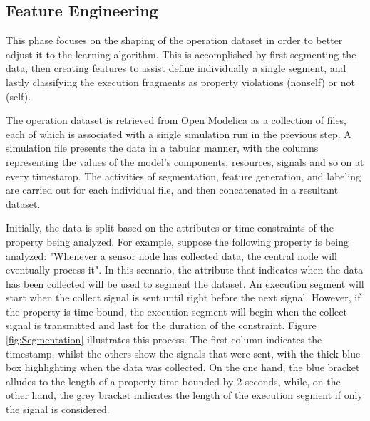 

\subsection{Feature Engineering}

This phase focuses on the shaping of the operation dataset in order to better adjust it to the learning algorithm. This is accomplished by first segmenting the data, then creating features to assist define individually a single segment, and lastly classifying the execution fragments as property violations (nonself) or not (self). 

The operation dataset is retrieved from Open Modelica as a collection of files, each of which is associated with a single simulation run in the previous step. A simulation file presents the data in a tabular manner, with the columns representing the values of the model's components, resources, signals and so on at every timestamp. The activities of segmentation, feature generation, and labeling are carried out for each individual file, and then concatenated in a resultant dataset.

Initially, the data is split based on the attributes or time constraints of the property being analyzed. For example, suppose the following property is being analyzed: "Whenever a sensor node has collected data, the central node will eventually process it". In this scenario, the attribute that indicates when the data has been collected will be used to segment the dataset. An execution segment will start when the collect signal is sent until right before the next signal. However, if the property is time-bound, the execution segment will begin when the collect signal is transmitted and last for the duration of the constraint. Figure \ref{fig:Segmentation} illustrates this process. The first column indicates the timestamp, whilst the others show the signals that were sent, with the thick blue box highlighting when the data was collected. On the one hand, the blue bracket alludes to the length of a property time-bounded by 2 seconds, while, on the other hand, the grey bracket indicates the length of the execution segment if only the signal is considered.

